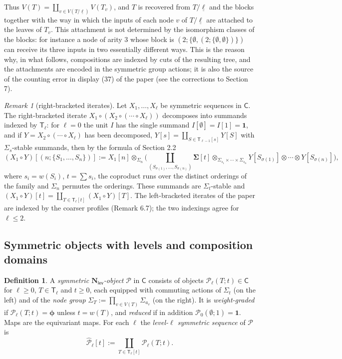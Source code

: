 \documentclass[12pt]{article}
\theoremstyle{plain}
\theoremstyle{definition}
\newtheorem{cdefinition}[ctheorem]{Definition}
\theoremstyle{remark}
\newtheorem{cremark}[ctheorem]{Remark}
\newcommand{\Cal}[1]{\mathcal{#1}}
\newcommand{\Nl}{\mathbf{N}_{\mathsf{lev}}}
\newcommand{\ptC}{\boldsymbol{\phi}}
\newcommand{\Tr}{\mathsf{T}}
\newcommand{\wt}{w}
\begin{document}
Thus $V(T)=\coprod_{v\in V(T/\underline\ell)}V(T_v)$, and $T$ is recovered from $T/\underline\ell$ and the blocks together with the way in which the inputs of each node $v$ of $T/\underline\ell$ are attached to the leaves of $T_v$. This attachment is not determined by the isomorphism classes of the blocks: for instance a node of arity $3$ whose block is $(2;\{\emptyset,(2;\{\emptyset,\emptyset\})\})$ can receive its three inputs in two essentially different ways. This is the reason why, in what follows, compositions are indexed by cuts of the resulting tree, and the attachments are encoded in the symmetric group actions; it is also the source of the counting error in display (37) of the paper (see the corrections to Section 7).

\begin{cremark}[right-bracketed iterates]\label{crem:right}
Let $X_1,\dots,X_\ell$ be symmetric sequences in $\mathsf C$. The right-bracketed iterate $X_1\circ(X_2\circ(\cdots\circ X_\ell))$ decomposes into summands indexed by $\Tr_\ell$: for $\ell=0$ the unit $I$ has the single summand $I[\emptyset]=I[1]=\mathbf 1$, and if $Y=X_2\circ(\cdots\circ X_\ell)$ has been decomposed, $Y[s]=\coprod_{S\in\Tr_{\ell-1}[s]}Y[S]$ with $\Sigma_s$-stable summands, then by the formula of Section 2.2
\begin{equation}\label{eq:corr:summand}
(X_1\circ Y)[(n;\{S_1,\dots,S_n\})]:=X_1[n]\otimes_{\Sigma_n}\Big(\coprod_{(S_{\sigma(1)},\dots,S_{\sigma(n)})}\mathbf\Sigma[t]\otimes_{\Sigma_{s_1}\times\cdots\times\Sigma_{s_n}}Y[S_{\sigma(1)}]\otimes\cdots\otimes Y[S_{\sigma(n)}]\Big),
\end{equation}
where $s_i=\wt(S_i)$, $t=\sum s_i$, the coproduct runs over the distinct orderings of the family and $\Sigma_n$ permutes the orderings. These summands are $\Sigma_t$-stable and $(X_1\circ Y)[t]=\coprod_{T\in\Tr_\ell[t]}(X_1\circ Y)[T]$. The left-bracketed iterates of the paper are indexed by the coarser profiles (Remark 6.7); the two indexings agree for $\ell\leq2$.
\end{cremark}

\subsection{Symmetric objects with levels and composition domains}
\label{sec:corr:objects}

\begin{cdefinition}\label{cdef:object}
A \emph{symmetric $\Nl$-object} $\Cal P$ in $\mathsf C$ consists of objects $\Cal P_\ell(T;t)\in\mathsf C$ for $\ell\geq0$, $T\in\Tr_\ell$ and $t\geq0$, each equipped with commuting actions of $\Sigma_t$ (on the left) and of the \emph{node group} $\Sigma_T:=\prod_{v\in V(T)}\Sigma_{a_v}$ (on the right). It is \emph{weight-graded} if $\Cal P_\ell(T;t)=\ptC$ unless $t=\wt(T)$, and \emph{reduced} if in addition $\Cal P_0(\emptyset;1)=\mathbf1$. Maps are the equivariant maps. For each $\ell$ the \emph{level-$\ell$ symmetric sequence} of $\Cal P$ is
\[\widehat{\Cal P}_\ell[t]:=\coprod_{T\in\Tr_\ell[t]}\Cal P_\ell(T;t).\]
\end{cdefinition}
\end{document}
